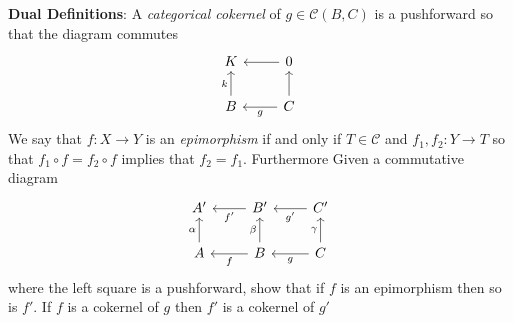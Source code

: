 \documentclass[11pt]{amsart}
\theoremstyle{definition}
\numberwithin{theorem}{section}
\numberwithin{definition}{section}
\numberwithin{equation}{section}
\def\scriptc{{\mathcal C}}
\begin{document}
\textbf{Dual Definitions}: A \emph{categorical cokernel} of $g \in \scriptc(B,C)$ is a pushforward so that the diagram commutes
\begin{equation*}
	\begin{tikzcd}
		K  & 0 \arrow{l}{} \\
		B \arrow{u}{k}  & \arrow{l}{g}C \arrow{u}{}
	\end{tikzcd}
\end{equation*}
We say that $f: X \to Y$ is an \emph{epimorphism} if and only if $T \in \scriptc$ and $f_1, f_2: Y \to T$ so that
$f_1 \circ f = f_2 \circ f$ implies that $f_2 = f_1$. Furthermore
Given a commutative diagram
\begin{equation*}
	\begin{tikzcd}
		A'  &\arrow{l}{f'} B'   & C'  \arrow{l}{g'} \\
		A \arrow{u}{\alpha} &B \arrow{u}{\beta} \arrow{l}{f}& C \arrow{u}{\gamma}  \arrow{l}{g} 
	\end{tikzcd}
\end{equation*}
where the left square is a pushforward, show that if $f$ is an epimorphism then so is $f'$. If $f$ is a cokernel of $g$ then $f'$ is a cokernel of $g'$
\end{document}
